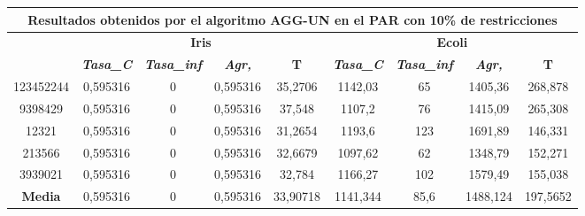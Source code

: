 \documentclass[12pt, spanish]{article}
\begin{document}
\begin{table}[H]
\footnotesize
\begin{tabular}{|c|c|c|c|c|c|c|c|c|}
\hline
\multicolumn{9}{|c|}{\textbf{Resultados obtenidos por el algoritmo AGG-UN en el PAR con 10\% de restricciones}}                                                                                                   \\ \hline
\multirow{2}{*}{} & \multicolumn{4}{c|}{\textbf{Iris}}                                                            & \multicolumn{4}{c|}{\textbf{Ecoli}}                                                           \\ \cline{2-9} 
                  & \textit{\textbf{Tasa\_C}} & \textit{\textbf{Tasa\_inf}} & \textit{\textbf{Agr,}} & \textbf{T} & \textit{\textbf{Tasa\_C}} & \textit{\textbf{Tasa\_inf}} & \textit{\textbf{Agr,}} & \textbf{T} \\ \hline
123452244         & 0,595316                  & 0                           & 0,595316               & 35,2706    & 1142,03                   & 65                          & 1405,36                & 268,878    \\ \hline
9398429           & 0,595316                  & 0                           & 0,595316               & 37,548     & 1107,2                    & 76                          & 1415,09                & 265,308    \\ \hline
12321             & 0,595316                  & 0                           & 0,595316               & 31,2654    & 1193,6                    & 123                         & 1691,89                & 146,331    \\ \hline
213566            & 0,595316                  & 0                           & 0,595316               & 32,6679    & 1097,62                   & 62                          & 1348,79                & 152,271    \\ \hline
3939021           & 0,595316                  & 0                           & 0,595316               & 32,784     & 1166,27                   & 102                         & 1579,49                & 155,038    \\ \hline
\textbf{Media}    & 0,595316                  & 0                           & 0,595316               & 33,90718   & 1141,344                  & 85,6                        & 1488,124               & 197,5652   \\ \hline
\end{tabular}
\end{table}
\end{document}
